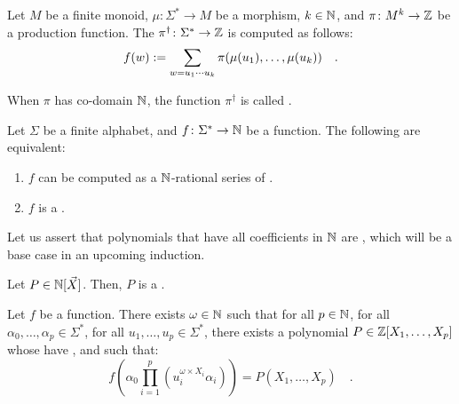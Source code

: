 \documentclass[a4paper,11pt]{article}
\begin{document}
\begin{definition}
    Let $M$ be a finite monoid, $\mu \colon \Sigma^* \to M$
    be a morphism, $k \in \mathbb{N}$, and 
    $\pi \colon M^k \to \mathbb{Z}$ be a production function.
    The 
    $\pi^\dagger \colon \Sigma^* \to \mathbb{Z}$
    is computed as follows:
    \begin{equation*}
        f(w) \mathrel{:=}
        \sum_{w = u_1 \cdots u_k} \pi(\mu(u_1), \dots, \mu(u_k))
        \quad .
    \end{equation*}

    When $\pi$ has co-domain $\mathbb{N}$, the function $\pi^\dagger$
    is called .
\end{definition}

\begin{fact}[see e.g. ...]
    \label{polynomial-rational-polyreg:fact}
    Let $\Sigma$ be a finite alphabet, and $f \colon \Sigma^* \to \mathbb{N}$
    be a function. The following are equivalent:
    \begin{enumerate}
        \item $f$ can be computed as a \k{$\mathbb{N}$-rational series}
            of .
        \item $f$ is a .
    \end{enumerate}
\end{fact}


Let us assert that polynomials that have all coefficients in $\mathbb{N}$ are
, which will be a base case in an upcoming
induction.

\begin{fact}
    \label{fact:n-poly-n-poly}
    Let $P \in \mathbb{N}[\vec{X}]$. Then, $P$
    is a .
\end{fact}


\begin{lemma}
    Let $f$ be a   function. 
    There exists $\omega \in \mathbb{N}$
    such that for all $p \in \mathbb{N}$,
    for all $\alpha_0, \dots, \alpha_p \in \Sigma^*$,
    for all $u_1, \dots, u_p \in \Sigma^*$,
    there exists a polynomial $P \in \mathbb{Z}[X_1, \dots, X_p]$
    whose  have ,
    and such that:
    \begin{equation*}
        f(\alpha_0 \prod_{i = 1}^p (u_i^{\omega \times X_i} \alpha_i))
        = P(X_1, \dots, X_p) \quad .
    \end{equation*}
\end{lemma}
\end{document}
